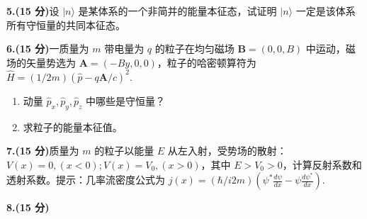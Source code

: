 \textbf{5.(15 分)}设 $|n\rangle$ 是某体系的一个非简并的能量本征态，试证明 $|n\rangle$ 一定是该体系所有守恒量的共同本征态。

\textbf{6.(15 分)}一质量为 $m$ 带电量为 $q$ 的粒子在均匀磁场 $\mathbf{B} = (0,0,B)$ 中运动，磁场的矢量势选为 $\mathbf{A} = (-By,0,0)$，粒子的哈密顿算符为 $\hat{H} = (1/2m)(\hat{p} - q\mathbf{A}/c)^2$.
    \begin{enumerate}
        \item 动量 $\hat{p}_x, \hat{p}_y, \hat{p}_z$ 中哪些是守恒量？
        \item 求粒子的能量本征值。
    \end{enumerate}

\textbf{7.(15 分)}质量为 $m$ 的粒子以能量 $E$ 从左入射，受势场的散射：$V(x) = 0, (x < 0); V(x) = V_0, (x > 0)$，其中 $E > V_0 > 0$，计算反射系数和透射系数。提示：几率流密度公式为 $j(x) = (\hbar/i2m)(\psi^* \frac{d\psi}{dx} - \psi \frac{d\psi^*}{dx})$.

\textbf{8.(15 分)}